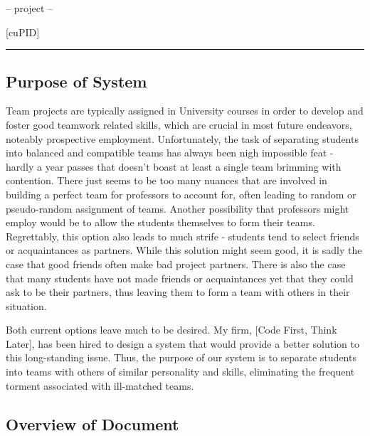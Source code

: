 \documentclass[12pt,letterpaper]{article}
\begin{document}
\begin{center}
-- project --
\end{center}

\begin{center}
{\Huge [cuPID]}
\end{center}

\begin{center}
\rule{0.85\textwidth}{0.5pt}
\end{center}

\subsection{Purpose of System}

Team projects are typically assigned in University courses in order to develop and foster
good teamwork related skills, which are crucial in most future endeavors, noteably 
prospective employment. Unfortunately, the task of separating students into balanced 
and compatible teams has always been nigh impossible feat - hardly a year passes that doesn't
boast at least a single team brimming with  contention. There just seems to be too many
nuances that are involved in building a perfect team for professors to account for, often leading
to random or pseudo-random assignment of teams. Another possibility that professors might employ
would be to allow the students themselves to form their teams. Regrettably, this option also
leads to much strife - students tend to select friends or acquaintances as partners. While this
solution might seem good, it is sadly the case that good friends often make bad project partners. 
There is also the case that many students have not made friends or acquaintances yet that they 
could ask to be their partners, thus leaving them to form a team with others in their situation.

Both current options leave much to be desired. My firm, [Code First, Think Later], has been hired
to design a system that would provide a better solution to this long-standing issue. Thus, the purpose of
our system is to separate students into teams with others of similar personality and skills, eliminating 
the frequent torment associated with ill-matched teams.

\subsection{Overview of Document}
\end{document}

